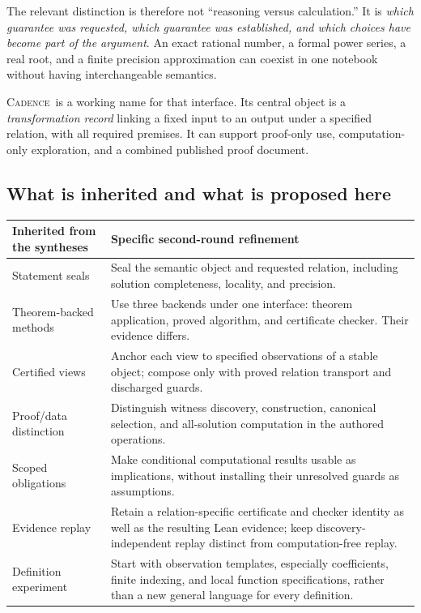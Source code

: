 \documentclass[11pt,letterpaper]{article}
\newcommand{\Cadence}{\textsc{Cadence}}
\theoremstyle{definition}
\begin{document}
The relevant distinction is therefore not ``reasoning versus calculation.'' It is
\emph{which guarantee was requested, which guarantee was established, and which
choices have become part of the argument}. An exact rational number, a formal
power series, a real root, and a finite precision approximation can coexist in one
notebook without having interchangeable semantics.

\Cadence\ is a working name for that interface. Its central object is a
\emph{transformation record} linking a fixed input to an output under a specified
relation, with all required premises. It can support proof-only use, computation-only
exploration, and a combined published proof document.

\subsection{What is inherited and what is proposed here}
\begin{tabularx}{\textwidth}{@{}P{.28\textwidth}Y@{}}
\toprule
Inherited from the syntheses & Specific second-round refinement \\
\midrule
Statement seals & Seal the semantic object and requested relation, including
solution completeness, locality, and precision.\\
Theorem-backed methods & Use three backends under one interface: theorem
application, proved algorithm, and certificate checker. Their evidence differs.\\
Certified views & Anchor each view to specified observations of a stable object;
compose only with proved relation transport and discharged guards.\\
Proof/data distinction & Distinguish witness discovery, construction, canonical
selection, and all-solution computation in the authored operations.\\
Scoped obligations & Make conditional computational results usable as implications,
without installing their unresolved guards as assumptions.\\
Evidence replay & Retain a relation-specific certificate and checker identity as
well as the resulting Lean evidence; keep discovery-independent replay distinct
from computation-free replay.\\
Definition experiment & Start with observation templates, especially coefficients,
finite indexing, and local function specifications, rather than a new general
language for every definition.\\
\bottomrule
\end{tabularx}
\end{document}
